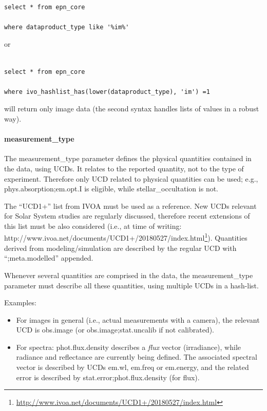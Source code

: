 \documentclass[11pt,a4paper]{ivoa}
\begin{document}
\begin{verbatim}

select * from epn_core 

where dataproduct_type like '%im%'

\end{verbatim}

or 

\begin{verbatim}

select * from epn_core 

where ivo_hashlist_has(lower(dataproduct_type), 'im') =1

\end{verbatim}

will return only image data (the second syntax handles lists of values in a robust way).

\paragraph{measurement\_type}

The measurement\_type parameter defines the physical quantities contained in the data, using UCDs. It relates to the reported quantity, not to the type of experiment. Therefore only UCD related to physical quantities can be used; e.g., phys.absorption;em.opt.I is eligible, while stellar\_occultation is not.

The ``UCD1+'' list from IVOA must be used as a reference. New UCDs relevant for Solar System studies are regularly discussed, therefore recent extensions of this list must be also considered (i.e., at time of writing: http://www.ivoa.net/documents/UCD1+/20180527/index.html\footnote{\url{http://www.ivoa.net/documents/UCD1+/20180527/index.html}}). Quantities derived from modeling/simulation are described by the regular UCD with ``;meta.modelled'' appended. 

Whenever several quantities are comprised in the data, the measurement\_type parameter must describe all these quantities, using multiple UCDs in a hash-list. 

Examples:

\begin{itemize}

\item For images in general (i.e., actual measurements with a camera), the relevant UCD is obs.image (or obs.image;stat.uncalib if not calibrated).

\item For spectra: phot.flux.density describes a \emph{flux} vector (irradiance), while radiance and reflectance are currently being defined. The associated spectral vector is described by UCDs em.wl, em.freq or em.energy, and the related error is described by stat.error;phot.flux.density (for flux).

\end{itemize}
\end{document}
